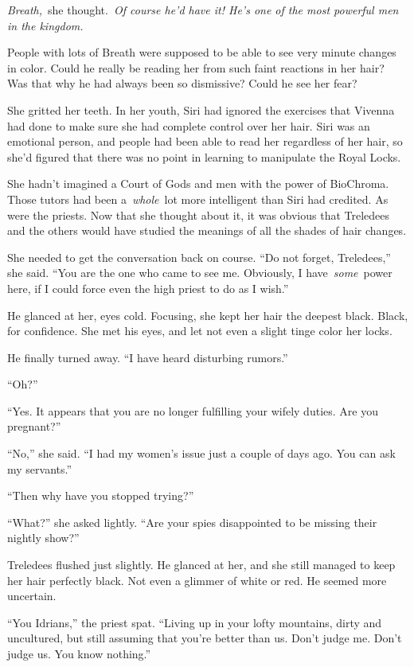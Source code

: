 \textit{Breath,}~she thought.~\textit{Of course he’d have it! He’s one of the most powerful men in the kingdom.}

People with lots of Breath were supposed to be able to see very minute changes in color. Could he really be reading her from such faint reactions in her hair? Was that why he had always been so dismissive? Could he see her fear?

She gritted her teeth. In her youth, Siri had ignored the exercises that Vivenna had done to make sure she had complete control over her hair. Siri was an emotional person, and people had been able to read her regardless of her hair, so she’d figured that there was no point in learning to manipulate the Royal Locks.

She hadn’t imagined a Court of Gods and men with the power of BioChroma. Those tutors had been a~\textit{whole}~lot more intelligent than Siri had credited. As were the priests. Now that she thought about it, it was obvious that Treledees and the others would have studied the meanings of all the shades of hair changes.

She needed to get the conversation back on course. “Do not forget, Treledees,” she said. “You are the one who came to see me. Obviously, I have~\textit{some}~power here, if I could force even the high priest to do as I wish.”

He glanced at her, eyes cold. Focusing, she kept her hair the deepest black. Black, for confidence. She met his eyes, and let not even a slight tinge color her locks.

He finally turned away. “I have heard disturbing rumors.”

“Oh?”

“Yes. It appears that you are no longer fulfilling your wifely duties. Are you pregnant?”

“No,” she said. “I had my women’s issue just a couple of days ago. You can ask my servants.”

“Then why have you stopped trying?”

“What?” she asked lightly. “Are your spies disappointed to be missing their nightly show?”

Treledees flushed just slightly. He glanced at her, and she still managed to keep her hair perfectly black. Not even a glimmer of white or red. He seemed more uncertain.

“You Idrians,” the priest spat. “Living up in your lofty mountains, dirty and uncultured, but still assuming that you’re better than us. Don’t judge me. Don’t judge us. You know nothing.”

